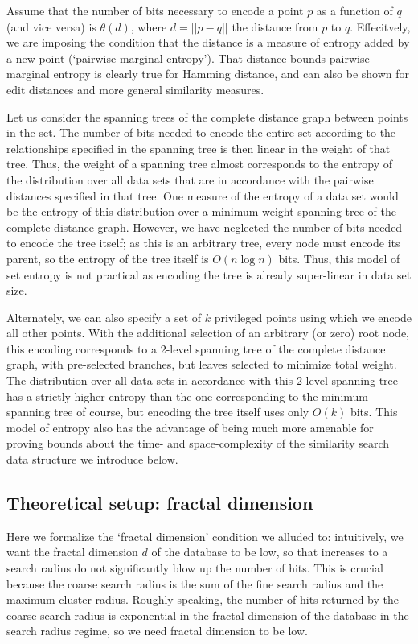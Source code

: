\documentclass{amsbook}
\theoremstyle{definition}
\theoremstyle{remark}
\numberwithin{equation}{section}
\begin{document}
Assume that the number of bits necessary to encode a point $p$ as a function of $q$ (and vice versa) is $\theta(d)$, where $d = ||p -q||$ the distance from $p$ to $q$.
Effecitvely, we are imposing the condition that the distance is a measure of entropy added by a new point (`pairwise marginal entropy').
That distance bounds pairwise marginal entropy is clearly true for Hamming distance, and can also be shown for edit distances and more general similarity measures.

Let us consider the spanning trees of the complete distance graph between points in the set.
The number of bits needed to encode the entire set according to the relationships specified in the spanning tree is then linear in the weight of that tree.
Thus, the weight of a spanning tree almost corresponds to the entropy of the distribution over all data sets that are in accordance with the pairwise distances specified in that tree.
One measure of the entropy of a data set would be the entropy of this distribution over a minimum weight spanning tree of the complete distance graph.
However, we have neglected the number of bits needed to encode the tree itself; as this is an arbitrary tree, every node must encode its parent, so the entropy of the tree itself is $O(n \log n)$ bits.
Thus, this model of set entropy is not practical as encoding the tree is already super-linear in data set size.

Alternately, we can also specify a set of $k$ privileged points using which we encode all other points.
With the additional selection of an arbitrary (or zero) root node, this encoding corresponds to a 2-level spanning tree of the complete distance graph, with pre-selected branches, but leaves selected to minimize total weight.
The distribution over all data sets in accordance with this 2-level spanning tree has a strictly higher entropy than the one corresponding to the minimum spanning tree of course, but encoding the tree itself uses only $O(k)$ bits.
This model of entropy also has the advantage of being much more amenable for proving bounds about the time- and space-complexity of the similarity search data structure we introduce below.

\subsection{Theoretical setup: fractal dimension}
Here we formalize the `fractal dimension' condition we alluded to: intuitively, we want the fractal dimension $d$ of the database to be low, so that increases to a search radius do not significantly blow up the number of hits.
This is crucial because the coarse search radius is the sum of the fine search radius and the maximum cluster radius.
Roughly speaking, the number of hits returned by the coarse search radius is exponential in the fractal dimension of the database in the search radius regime, so we need fractal dimension to be low.
\end{document}
